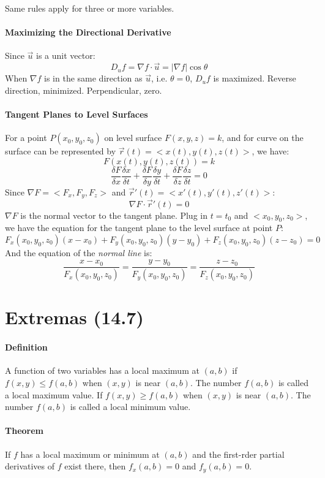 \documentclass[11pt, oneside]{article}   	%
\begin{document}
\par
Same rules apply for three or more variables.
\paragraph{Maximizing the Directional Derivative}
Since $\vec{u}$ is a unit vector: $$D_uf = \nabla f \cdot \vec{u} = |\nabla f| \cos{\theta}$$
When $\nabla f$ is in the same direction as $\vec{u}$, i.e. $\theta = 0$, $D_uf$ is maximized. Reverse direction, minimized. Perpendicular, zero.

\paragraph{Tangent Planes to Level Surfaces}
For a point $P(x_0,y_0,z_0)$ on level surface $F(x,y,z) = k$, and for curve on the surface can be represented by $\vec{r}(t) = <x(t), y(t), z(t)>$, we have:
$$F(x(t),y(t),z(t))=k$$
$$\frac{\delta F}{\delta x}\frac{\delta x}{\delta t} + \frac{\delta F}{\delta y}\frac{\delta y}{\delta t}+\frac{\delta F}{\delta z}\frac{\delta z}{\delta t} =0$$
Since  $\nabla F = <F_x, F_y, F_z>$ and $\vec{r}'(t) = <x'(t),y'(t),z'(t)>$: $$\nabla F\cdot \vec{r}'(t) = 0$$
$\nabla F$ is the normal vector to the tangent plane. Plug in $t = t_0$ and $<x_0, y_0, z_0>$, we have the equation for the tangent plane to the level surface at point $P$: $$F_x(x_0,y_0,z_0)(x-x_0)+F_y(x_0,y_0,z_0)(y-y_0)+F_z(x_0,y_0,z_0)(z-z_0) = 0$$ And the equation of the \emph{normal line} is: $$\frac{x-x_0}{F_x(x_0,y_0,z_0)} = \frac{y-y_0}{F_y(x_0,y_0,z_0)} = \frac{z-z_0}{F_z(x_0,y_0,z_0)}$$



\section{Extremas (14.7)}
\paragraph{Definition} A function of two variables has a local maximum at $(a,b)$ if $f(x,y)\leq f(a,b)$ when $(x,y)$ is near $(a,b)$. The number $f(a,b)$ is called a local maximum value. If $f(x,y)\geq f(a,b)$ when $(x,y)$ is near $(a,b)$. The number $f(a,b)$ is called a local minimum value.
\paragraph{Theorem} If $f$ has a local maximum or minimum at $(a,b)$ and the first-rder partial derivatives of $f$ exist there, then $f_x(a,b) = 0$ and $f_y(a,b)=0$.
\end{document}

